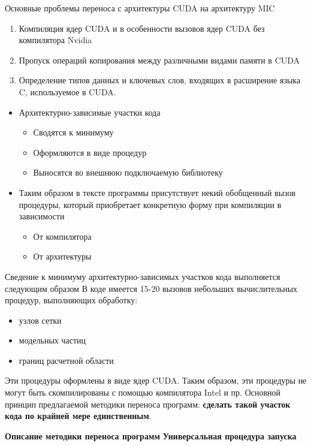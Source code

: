 Основные проблемы переноса с архитектуры CUDA\cite{CUDAweb,Boreskov,Sanders} на архитектуру MIC\cite{MorganPhi,FangPhi2014}
\begin{enumerate}
	\item Компиляция ядер CUDA 
	и в особенности вызовов ядер CUDA без компилятора Nvidia
	\item Пропуск операций копирования между различными видами памяти в CUDA
	\item Определение типов данных и ключевых слов, входящих в расширение языка C, используемое в CUDA.
\end{enumerate}


\begin{itemize}
	\item Архитектурно-зависимые участки кода 
	\begin{itemize}
		\item Сводятся к минимуму
		\item Оформляются в виде процедур 
		\item Выносятся во внешнюю подключаемую библиотеку
	\end{itemize}
	\item Таким образом в тексте программы присутствует некий обобщенный вызов процедуры, который приобретает конкретную форму при компиляции в зависимости
	\begin{itemize}
		\item От компилятора
		\item От архитектуры
	\end{itemize}
\end{itemize}

Сведение к минимуму архитектурно-зависимых участков кода выполняется следующим образом 
В коде имеется 15-20 вызовов небольших вычислительных процедур, 
выполняющих обработку:
\begin{itemize}
	\item узлов сетки
	\item модельных частиц
	\item границ расчетной области
\end{itemize}
Эти процедуры оформлены в виде ядер CUDA. Таким образом, эти процедуры не могут быть скомпилированы с помощью компилятора Intel и пр.
Основной принцип предлагаемой методики переноса программ: \textbf{сделать такой участок кода по крайней мере единственным}.

\textbf{Описание методики переноса программ}
\textbf{Универсальная процедура запуска}

